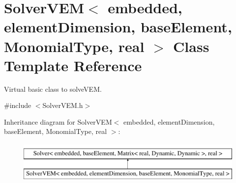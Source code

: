 \hypertarget{class_solver_v_e_m}{}\section{Solver\+V\+EM$<$ embedded, element\+Dimension, base\+Element, Monomial\+Type, real $>$ Class Template Reference}
\label{class_solver_v_e_m}


Virtual basic class to solve\+V\+EM.  




{\ttfamily \#include $<$Solver\+V\+E\+M.\+h$>$}

Inheritance diagram for Solver\+V\+EM$<$ embedded, element\+Dimension, base\+Element, Monomial\+Type, real $>$\+:\begin{figure}[H]
\begin{center}
\leavevmode
\includegraphics[height=2.000000cm]{class_solver_v_e_m}
\end{center}
\end{figure}
